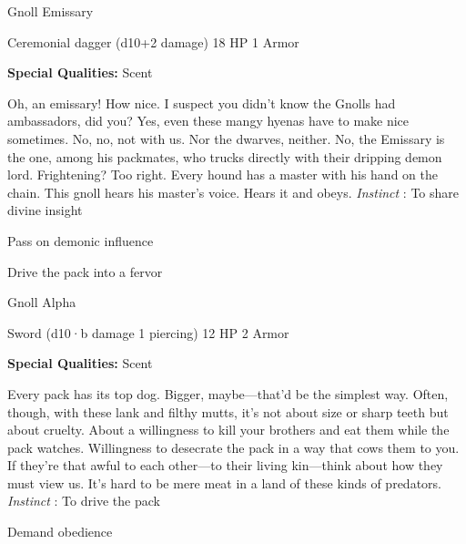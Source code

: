 \stopitemize
 
\startMonsterName
Gnoll Emissary	 
\stopMonsterName
 

Ceremonial dagger (d10+2 damage)	18 HP	1 Armor

 


 
\startMonsterQualities
{\bf Special Qualities:}  Scent
\stopMonsterQualities
 
\startMonsterDescription
Oh, an emissary! How nice. I suspect you didn’t know the Gnolls had ambassadors, did you? Yes, even these mangy hyenas have to make nice sometimes. No, no, not with us. Nor the dwarves, neither. No, the Emissary is the one, among his packmates, who trucks directly with their dripping demon lord. Frightening? Too right. Every hound has a master with his hand on the chain. This gnoll hears his master’s voice. Hears it and obeys. {\em Instinct} : To share divine insight
\stopMonsterDescription
 
\startitemize[1,packed]

\item Pass on demonic influence

 
\item Drive the pack into a fervor


\stopitemize
 
\startMonsterName
Gnoll Alpha	 
\stopMonsterName
 

Sword (d10·b damage 1 piercing)	12 HP	2 Armor

 


 
\startMonsterQualities
{\bf Special Qualities:}  Scent
\stopMonsterQualities
 
\startMonsterDescription
Every pack has its top dog. Bigger, maybe—that’d be the simplest way. Often, though, with these lank and filthy mutts, it’s not about size or sharp teeth but about cruelty. About a willingness to kill your brothers and eat them while the pack watches. Willingness to desecrate the pack in a way that cows them to you. If they’re that awful to each other—to their living kin—think about how they must view us. It’s hard to be mere meat in a land of these kinds of predators. {\em Instinct} : To drive the pack
\stopMonsterDescription
 
\startitemize[1,packed]

\item Demand obedience


